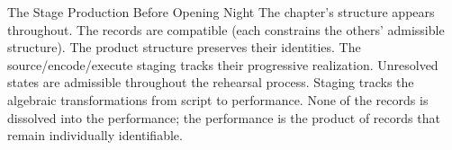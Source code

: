 \begin{coda}{The Stage Production Before Opening Night}
The chapter's structure appears throughout. The records are
compatible (each constrains the others' admissible structure).
The product structure preserves their identities. The
source/encode/execute staging tracks their progressive
realization. Unresolved states are admissible throughout the
rehearsal process. Staging tracks the algebraic transformations
from script to performance. None of the records is dissolved into
the performance; the performance is the product of records that
remain individually identifiable.

\end{coda}

